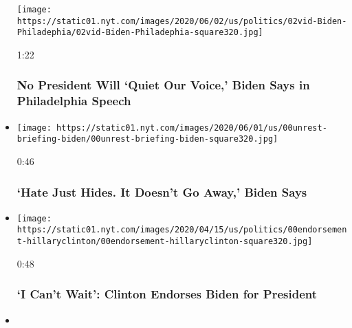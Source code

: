 \begin{itemize}
  \texttt{[image: https://static01.nyt.com/images/2020/06/02/us/politics/02vid-Biden-Philadephia/02vid-Biden-Philadephia-square320.jpg]}

  1:22

  \hypertarget{no-president-will-quiet-our-voice-biden-says-in-philadelphia-speech}{%
  \subsubsection{No President Will `Quiet Our Voice,' Biden Says in
  Philadelphia
  Speech}\label{no-president-will-quiet-our-voice-biden-says-in-philadelphia-speech}}
\item
  \href{https://www.nytimes.com/video/us/elections/100000007168118/hate-just-hides-it-doesnt-go-away-biden-says.html?action=click\&module=video-series-bar\&region=header\&pgtype=Article\&playlistId=video/2020-Elections}{}

  \texttt{[image: https://static01.nyt.com/images/2020/06/01/us/00unrest-briefing-biden/00unrest-briefing-biden-square320.jpg]}

  0:46

  \hypertarget{hate-just-hides-it-doesnt-go-away-biden-says}{%
  \subsubsection{`Hate Just Hides. It Doesn't Go Away,' Biden
  Says}\label{hate-just-hides-it-doesnt-go-away-biden-says}}
\item
  \href{https://www.nytimes.com/video/us/politics/100000007111258/watch-live-hillary-clinton-endorses-biden.html?action=click\&module=video-series-bar\&region=header\&pgtype=Article\&playlistId=video/2020-Elections}{}

  \texttt{[image: https://static01.nyt.com/images/2020/04/15/us/politics/00endorsement-hillaryclinton/00endorsement-hillaryclinton-square320.jpg]}

  0:48

  \hypertarget{i-cant-wait-clinton-endorses-biden-for-president}{%
  \subsubsection{`I Can't Wait': Clinton Endorses Biden for
  President}\label{i-cant-wait-clinton-endorses-biden-for-president}}
\item
  \href{https://www.nytimes.com/video/us/politics/100000007109631/pelosi-endorses-biden.html?action=click\&module=video-series-bar\&region=header\&pgtype=Article\&playlistId=video/2020-Elections}{}


\end{itemize}

